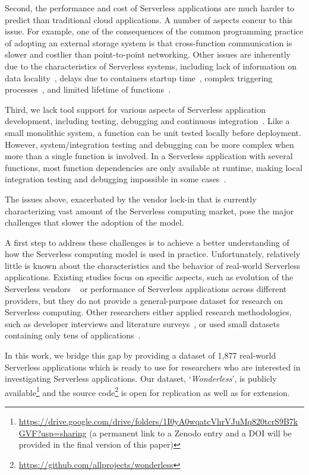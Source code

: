Second, the performance and cost of Serverless applications are much harder to 
predict than traditional cloud applications. A number of aspects concur 
to this issue.
For example, one of the consequences of the common programming practice
of adopting an external storage system is that cross-function communication 
is slower and costlier than point-to-point networking.
Other issues are inherently due to the characteristics of Serverless systems,
including lack of information on data locality~\cite{DBLP:journals/corr/abs-1902-03383},
delays due to containers startup time~\cite{manner2018cold}, 
complex triggering processes~\cite{pelle2019towards}, and
limited lifetime of functions~\cite{hellerstein2018serverless}.

Third, we lack tool support for various aspects of
Serverless application development, including testing, debugging 
and continuous integration~\cite{lenarduzzi2020serverless,nupponen2020serverless}.
Like a small monolithic system, a function can be unit tested 
locally before deployment. 
However, system/integration testing and debugging can 
be more complex when more than a single function is involved. 
In a Serverless application with several functions, 
most function
dependencies are only available at runtime, 
making local integration testing and debugging impossible in 
some cases~\cite{leitner2019mixed}.


The issues above, exacerbated by the vendor lock-in that is currently 
characterizing vast amount of the Serverless computing market, 
pose the major challenges that slower the adoption of the \faas model. 

A first step to address these challenges is to achieve a 
better understanding of how the Serverless computing model is used in practice. 
Unfortunately, relatively little is known about the characteristics 
and the behavior of real-world Serverless applications. Existing studies focus 
on specific aspects, such as evolution of the Serverless vendors ~\cite{spillner2019quantitative} 
or performance of Serverless applications across different providers\cite{wang2018peeking,lloyd2018serverless},
but they do not provide a general-purpose dataset for research on Serverless computing.
Other researchers either applied research methodologies, 
such as developer interviews and literature surveys~\cite{leitner2019mixed},
or used small datasets containing only tens of applications~\cite{eismann2020serverless}.


In this work, we bridge this gap by providing a dataset of 1,877 real-world Serverless 
applications which is ready to use for researchers who are interested in investigating
Serverless applications. Our dataset, `\emph{Wonderless}', is publicly 
available\footnote{\url{https://drive.google.com/drive/folders/1I0yA0wqatcVhrVJuMq820tcrS9B7kGVF?usp=sharing}
(a permanent link to a Zenodo entry and a DOI will be provided in the final version of this paper)} 
and the source code\footnote{\url{https://github.com/allprojects/wonderless}} 
is open for replication as well as for extension.











